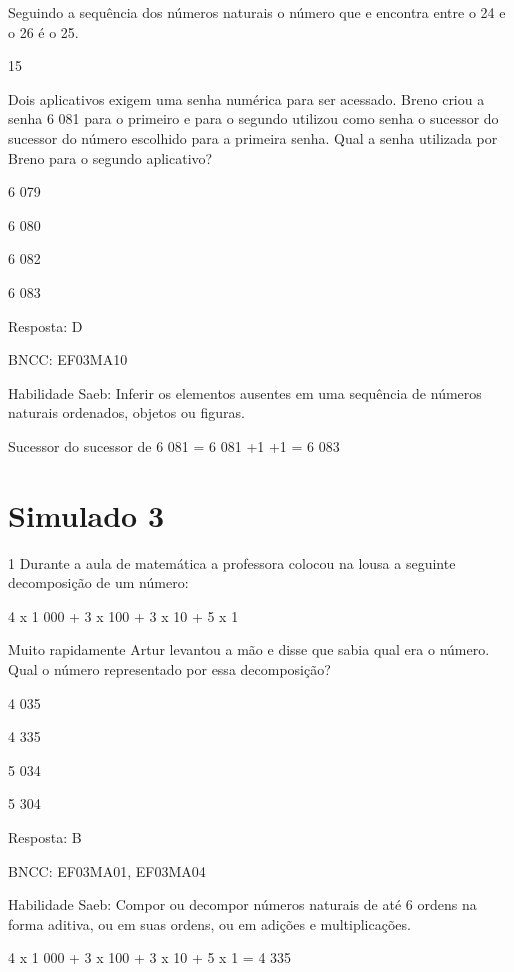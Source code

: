 \begin{escolha}
Seguindo a sequência dos números naturais o número que e encontra entre
o 24 e o 26 é o 25.

\num{15}

Dois aplicativos exigem uma senha numérica para ser acessado. Breno
criou a senha 6 081 para o primeiro e para o segundo utilizou como senha
o sucessor do sucessor do número escolhido para a primeira senha. Qual a
senha utilizada por Breno para o segundo aplicativo?

\begin{escolha}
\item
  6 079
\item
  6 080
\item
  6 082
\item
  6 083
\end{escolha}

Resposta: D

BNCC: EF03MA10

Habilidade Saeb: Inferir os elementos ausentes em uma sequência de
números naturais ordenados, objetos ou figuras.

Sucessor do sucessor de 6 081 = 6 081 +1 +1 = 6 083

\chapter{Simulado 3}

\num{1} Durante a aula de matemática a professora colocou na lousa
a seguinte decomposição de um número:

4 x 1 000 + 3 x 100 + 3 x 10 + 5 x 1

Muito rapidamente Artur levantou a mão e disse que sabia qual era o
número. Qual o número representado por essa decomposição?

\begin{escolha}
\item
  4 035
\item
  4 335
\item
  5 034
\item
  5 304
\end{escolha}

Resposta: B

BNCC: EF03MA01, EF03MA04

Habilidade Saeb: Compor ou decompor números naturais de até 6 ordens na
forma aditiva, ou em suas ordens, ou em adições e multiplicações.

4 x 1 000 + 3 x 100 + 3 x 10 + 5 x 1 = 4 335


\end{escolha}
